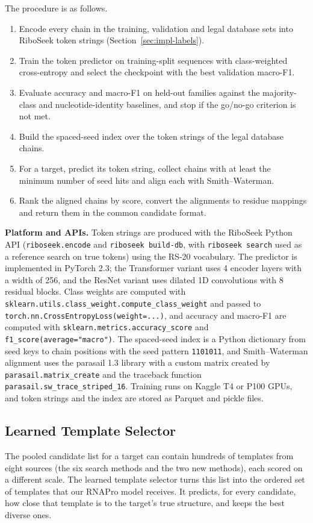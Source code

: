 \documentclass{FastFyp}
\begin{document}
The procedure is as follows.

\begin{enumerate}
\item Encode every chain in the training, validation and legal database sets into RiboSeek token strings (Section~\ref{sec:impl-labels}).
\item Train the token predictor on training-split sequences with class-weighted cross-entropy and select the checkpoint with the best validation macro-F1.
\item Evaluate accuracy and macro-F1 on held-out families against the majority-class and nucleotide-identity baselines, and stop if the go/no-go criterion is not met.
\item Build the spaced-seed index over the token strings of the legal database chains.
\item For a target, predict its token string, collect chains with at least the minimum number of seed hits and align each with Smith--Waterman.
\item Rank the aligned chains by score, convert the alignments to residue mappings and return them in the common candidate format.
\end{enumerate}

\textbf{Platform and APIs.} Token strings are produced with the RiboSeek Python API (\texttt{riboseek.encode} and \texttt{riboseek build-db}, with \texttt{riboseek search} used as a reference search on true tokens) using the RS-20 vocabulary. The predictor is implemented in PyTorch 2.3; the Transformer variant uses 4 encoder layers with a width of 256, and the ResNet variant uses dilated 1D convolutions with 8 residual blocks. Class weights are computed with \texttt{sklearn.utils.class\_weight.compute\_class\_weight} and passed to \texttt{torch.nn.CrossEntropyLoss(weight=...)}, and accuracy and macro-F1 are computed with \texttt{sklearn.metrics.accuracy\_score} and \texttt{f1\_score(average="macro")}. The spaced-seed index is a Python dictionary from seed keys to chain positions with the seed pattern \texttt{1101011}, and Smith--Waterman alignment uses the parasail 1.3 library with a custom matrix created by \texttt{parasail.matrix\_create} and the traceback function \texttt{parasail.sw\_trace\_striped\_16}. Training runs on Kaggle T4 or P100 GPUs, and token strings and the index are stored as Parquet and pickle files.

\subsection{Learned Template Selector}
\label{sec:impl-selector}
The pooled candidate list for a target can contain hundreds of templates from eight sources (the six search methods and the two new methods), each scored on a different scale. The learned template selector turns this list into the ordered set of templates that our RNAPro model receives. It predicts, for every candidate, how close that template is to the target's true structure, and keeps the best diverse ones.
\end{document}
